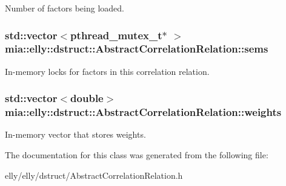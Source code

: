 Number of factors being loaded. \hypertarget{classmia_1_1elly_1_1dstruct_1_1_abstract_correlation_relation_a10a0c3ac052768f044f4c0a7da5f2a80}{
\subsubsection[{sems}]{\setlength{\rightskip}{0pt plus 5cm}std\-::vector$<$pthread\-\_\-mutex\-\_\-t$\ast$ $>$ mia\-::elly\-::dstruct\-::\-Abstract\-Correlation\-Relation\-::sems}}\label{classmia_1_1elly_1_1dstruct_1_1_abstract_correlation_relation_a10a0c3ac052768f044f4c0a7da5f2a80}
In-\/memory locks for factors in this correlation relation. \hypertarget{classmia_1_1elly_1_1dstruct_1_1_abstract_correlation_relation_a8a094d32441aca190c2ab019407de95a}{
\subsubsection[{weights}]{\setlength{\rightskip}{0pt plus 5cm}std\-::vector$<$double$>$ mia\-::elly\-::dstruct\-::\-Abstract\-Correlation\-Relation\-::weights}}\label{classmia_1_1elly_1_1dstruct_1_1_abstract_correlation_relation_a8a094d32441aca190c2ab019407de95a}
In-\/memory vector that stores weights. 

The documentation for this class was generated from the following file\-:\begin{DoxyCompactItemize}
\item 
elly/elly/dstruct/Abstract\-Correlation\-Relation.\-h\end{DoxyCompactItemize}
